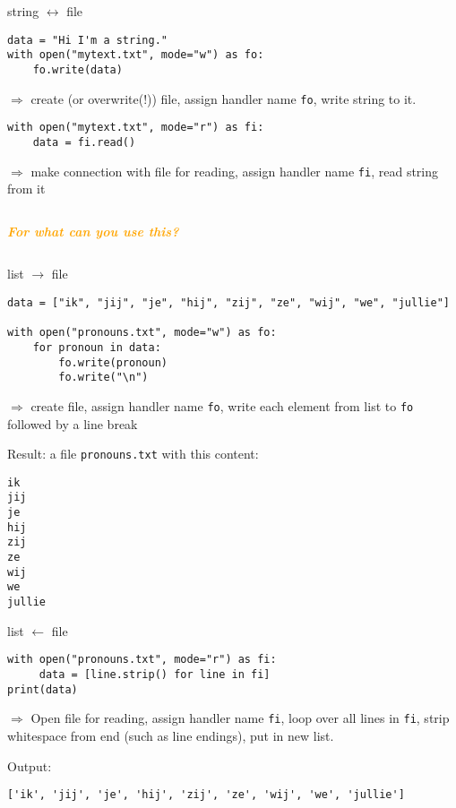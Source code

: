 \documentclass[compress]{beamer}
\newcommand{\question}[1]{
	\begin{frame}[plain]
		\begin{columns}
			\column{.3\textwidth}
			\makebox[\columnwidth]{
				\texttt{[image: mannetje.png]}}
			\column{.7\textwidth}
			\large
			\textcolor{orange}{\textbf{\emph{#1}}}
		\end{columns}
\end{frame}}
\begin{document}
\begin{frame}[fragile]{string $\leftrightarrow$ file}
\begin{lstlisting}
data = "Hi I'm a string."
with open("mytext.txt", mode="w") as fo:
    fo.write(data)
\end{lstlisting}
$\Rightarrow$ create (or overwrite(!)) file, assign handler name \texttt{fo}, write string to it.

\pause 
\begin{lstlisting}
with open("mytext.txt", mode="r") as fi:
    data = fi.read()
\end{lstlisting}

$\Rightarrow$ make connection with file for reading, assign handler name \texttt{fi}, read string from it

\pause

\end{frame}

\question{For what can you use this?}


\begin{frame}[fragile]{list $\rightarrow$ file}
\begin{lstlisting}
data = ["ik", "jij", "je", "hij", "zij", "ze", "wij", "we", "jullie"]

with open("pronouns.txt", mode="w") as fo:
    for pronoun in data:
        fo.write(pronoun)
        fo.write("\n")
\end{lstlisting}
$\Rightarrow$ create file, assign handler name \texttt{fo}, write each element from list to \texttt{fo} followed by a line break

Result: a file \texttt{pronouns.txt} with this content:
\begin{lstlisting}
ik
jij
je
hij
zij
ze
wij
we
jullie
\end{lstlisting}
\end{frame}



\begin{frame}[fragile]{list $\leftarrow$ file}
\begin{lstlisting}
with open("pronouns.txt", mode="r") as fi:
     data = [line.strip() for line in fi]
print(data)
\end{lstlisting}
$\Rightarrow$ Open file for reading, assign handler name \texttt{fi}, loop over all lines in \texttt{fi}, strip whitespace from end (such as line endings), put in new list.

Output:
\begin{lstlisting}
['ik', 'jij', 'je', 'hij', 'zij', 'ze', 'wij', 'we', 'jullie']
\end{lstlisting}
\end{frame}
\end{document}
